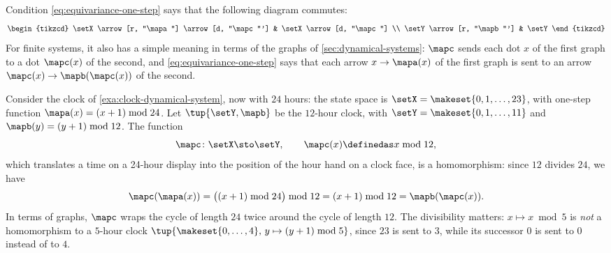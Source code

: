 
Condition \cref{eq:equivariance-one-step} says that the following diagram commutes:
\begin{equation}
    \begin{tikzcd}
        \setX \arrow[r, "\mapa"] \arrow[d, "\mapc"'] & \setX \arrow[d, "\mapc"] \\
        \setY \arrow[r, "\mapb"']                    & \setY
    \end{tikzcd}
\end{equation}
For finite systems, it also has a simple meaning in terms of the graphs of \cref{sec:dynamical-systems}: $\mapc$ sends each dot $x$ of the first graph to a dot $\mapc(x)$ of the second, and \cref{eq:equivariance-one-step} says that each arrow $x \to \mapa(x)$ of the first graph is sent to an arrow $\mapc(x) \to \mapb(\mapc(x))$ of the second.

\begin{example}
    \label{exa:clock-24-to-12}
    Consider the clock of \cref{exa:clock-dynamical-system}, now with $24$ hours: the state space is $\setX = \makeset{0, 1, \dots, 23}$, with one-step function $\mapa(x) = (x + 1) \bmod 24$.
    Let $\tup{\setY, \mapb}$ be the $12$-hour clock, with $\setY = \makeset{0, 1, \dots, 11}$ and $\mapb(y) = (y + 1) \bmod 12$.
    The function
    \begin{equation}
        \mapc \colon \setX \sto \setY, \qquad \mapc(x) \definedas x \bmod 12,
    \end{equation}
    which translates a time on a 24-hour display into the position of the hour hand on a clock face, is a homomorphism: since $12$ divides $24$, we have
    \begin{equation}
        \mapc(\mapa(x)) = \bigl((x + 1) \bmod 24\bigr) \bmod 12 = (x + 1) \bmod 12 = \mapb(\mapc(x)).
    \end{equation}
    In terms of graphs, $\mapc$ wraps the cycle of length $24$ twice around the cycle of length $12$.
    The divisibility matters: $x \mapsto x \bmod 5$ is \emph{not} a homomorphism to a $5$-hour clock $\tup{\makeset{0, \dots, 4}, \, y \mapsto (y + 1) \bmod 5}$, since $23$ is sent to $3$, while its successor $0$ is sent to $0$ instead of to $4$.
\end{example}

